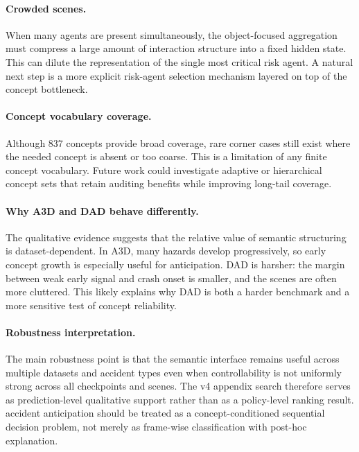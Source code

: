 \paragraph{Crowded scenes.}
When many agents are present simultaneously, the object-focused aggregation
must compress a large amount of interaction structure into a fixed hidden
state. This can dilute the representation of the single most critical risk
agent. A natural next step is a more explicit risk-agent selection mechanism
layered on top of the concept bottleneck.

\paragraph{Concept vocabulary coverage.}
Although 837 concepts provide broad coverage, rare corner cases still exist
where the needed concept is absent or too coarse. This is a limitation of any
finite concept vocabulary. Future work could investigate adaptive or
hierarchical concept sets that retain auditing benefits while improving
long-tail coverage.

\paragraph{Why A3D and DAD behave differently.}
The qualitative evidence suggests that the relative value of semantic
structuring is dataset-dependent. In A3D, many hazards develop progressively,
so early concept growth is especially useful for anticipation. DAD is harsher:
the margin between weak early signal and crash onset is smaller, and the scenes
are often more cluttered. This likely explains why DAD is both a harder
benchmark and a more sensitive test of concept reliability.

\paragraph{Robustness interpretation.}
The main robustness point is that the semantic interface remains useful across
multiple datasets and accident types even when controllability is not uniformly
strong across all checkpoints and scenes. The v4 appendix search therefore
serves as prediction-level qualitative support rather than as a policy-level
ranking result.
accident anticipation should be treated as a concept-conditioned sequential
decision problem, not merely as frame-wise classification with post-hoc
explanation.
